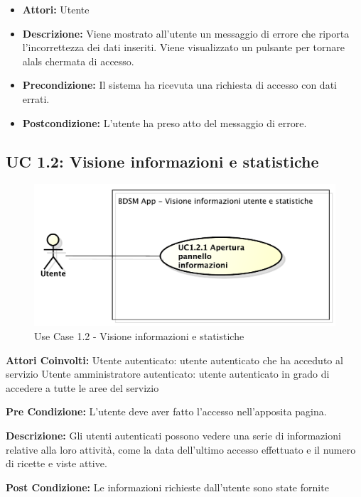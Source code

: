 \begin{itemize}
    \item \textbf{Attori:} Utente
    \item \textbf{Descrizione:} Viene mostrato all'utente un messaggio di errore che riporta l'incorrettezza dei dati inseriti. Viene visualizzato un pulsante per tornare alals chermata di accesso.
    \item \textbf{Precondizione:} Il sistema ha ricevuta una richiesta di accesso con dati errati.
    \item \textbf{Postcondizione:} L'utente ha preso atto del messaggio di errore.
\end{itemize}

\subsection{UC 1.2: Visione informazioni e statistiche}

\begin{figure}[htbp]
    \centering
    \centerline{\includegraphics[scale=0.6]{./images/UC1_2.pdf}}
    \caption{Use Case 1.2 - Visione informazioni e statistiche}
\end{figure}

\textbf{Attori Coinvolti:}
Utente autenticato: utente autenticato che ha acceduto al servizio
Utente amministratore autenticato: utente autenticato in grado di accedere a tutte le aree del servizio

\textbf{Pre Condizione:}
L'utente deve aver fatto l'accesso nell'apposita pagina.

\textbf{Descrizione:}
Gli utenti autenticati possono vedere una serie di informazioni relative alla loro attività, come la data dell’ultimo accesso effettuato e il numero di ricette e viste attive.

\textbf{Post Condizione:}
Le informazioni richieste dall'utente sono state fornite

